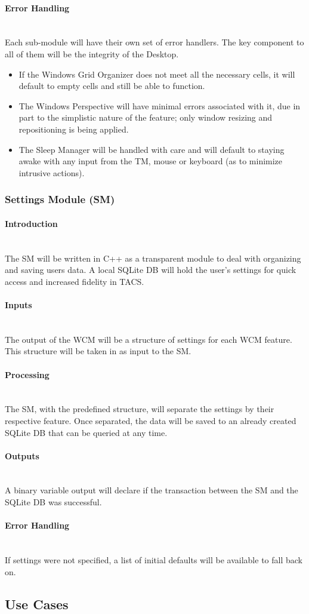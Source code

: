 \documentclass[titlepage]{article}
\newcommand{\myparagraph}[1]{\paragraph{#1}\mbox{}\\}
\begin{document}
\myparagraph{Error Handling}
Each sub-module will have their own set of error handlers. The key component to all of them will be the integrity of the Desktop. 
\begin{itemize}
	\item If the Windows Grid Organizer does not meet all the necessary cells, it will default to empty cells and still be able to function.
	\item The Windows Perspective will have minimal errors associated with it, due in part to the simplistic nature of the feature; only window resizing and repositioning is being applied. 
	\item The Sleep Manager will be handled with care and will default to staying awake with any input from the TM, mouse or keyboard (as to minimize intrusive actions).
\end{itemize}

\subsubsection{Settings Module (SM)}

\myparagraph{Introduction}
The SM will be written in C++ as a transparent module to deal with organizing and saving users data. A local SQLite DB will hold the user's settings for quick access and increased fidelity in TACS.

\myparagraph{Inputs}
The output of the WCM will be a structure of settings for each WCM feature. This structure will be taken in as input to the SM.

\myparagraph{Processing}
The SM, with the predefined structure, will separate the settings by their respective feature. Once separated, the data will be saved to an already created SQLite DB that can be queried at any time.

\myparagraph{Outputs}
A binary variable output will declare if the transaction between the SM and the SQLite DB was successful.

\myparagraph{Error Handling}
If settings were not specified, a list of initial defaults will be available to fall back on.

\subsection{Use Cases}
\end{document}
